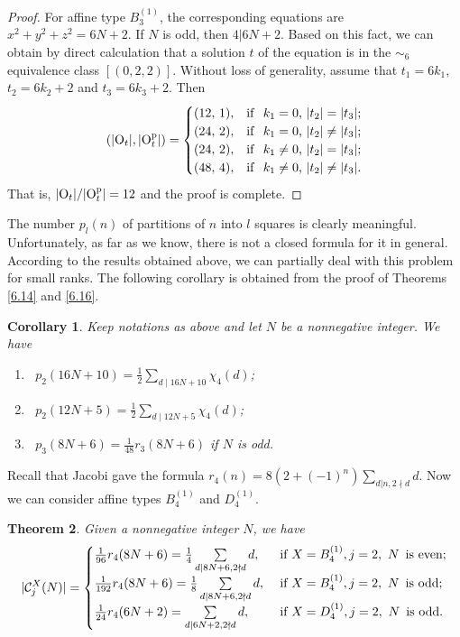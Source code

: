\documentclass[11pt]{amsart}
\theoremstyle{plain}
\numberwithin{equation}{subsection}
\newtheorem{theorem}{Theorem}[section]
\newtheorem{corollary}[theorem]{Corollary}
\begin{document}
\begin{proof}
For affine type $B_3^{(1)}$, the corresponding equations are $x^2+y^2+z^2=6N+2$. 
If $N$ is odd, then $4|6N+2$. Based on this fact, we can obtain by direct calculation 
that a solution $t$ of the equation is in the $\sim_6$ equivalence class $[(0, 2, 2)]$.
Without loss of generality, assume that $t_1=6k_1$, $t_2=6k_2+2$ and $t_3=6k_3+2$. Then
$$(|{\rm O}_t|, |{\rm O}_t^{\rm p}|)=
\begin{cases}
(12,\,1),  &  {\rm if }\,\, \text{ $k_1=0$, $|t_2|=|t_3|$}; \\
(24,\,2),  & {\rm if }\,\, \text{ $k_1=0$, $|t_2|\neq|t_3|$};\\
(24,\,2),  & {\rm if }\,\, \text{ $k_1\neq0$, $|t_2|=|t_3|$};\\
(48,\,4),  & {\rm if }\,\, \text{ $k_1\neq0$, $|t_2|\neq|t_3|$.}
\end{cases}$$
That is, $|{\rm O}_t|/|{\rm O}_t^{\rm p}|=12$ and the proof is complete.
\end{proof}

The number $p_l(n)$ of partitions of $n$ into $l$ squares is clearly meaningful. Unfortunately, as far as we know, there is not a closed formula for it in general.
According to the results obtained above, we can partially deal with this problem for small ranks. 
The following corollary is obtained from the proof of Theorems \ref{6.14} and \ref{6.16}.

\begin{corollary}
Keep notations as above and let $N$ be a nonnegative integer. We have
\begin{enumerate}
  \item[\rm (1)]\, $p_2(16N+10)=\frac{1}{2}\sum\limits_{d\mid 16N+10}\chi_4(d)$;
  \item[\rm (2)]\, $p_2(12N+5)= \frac{1}{2}\sum\limits_{d\mid 12N+5}\chi_4(d)$;
  \item[\rm (3)]\, $p_3(8N+6)= \frac{1}{48}r_3(8N+6)$ if $N$ is odd.
\end{enumerate}
\end{corollary}

Recall that Jacobi gave the formula $r_4(n)=8(2+(-1)^n)\sum\limits_{d|n, 2\nmid d}d$.
Now we can consider affine types $B_4^{(1)}$ and $D_4^{(1)}$. 

\begin{theorem}
Given a nonnegative integer $N$, we have
$$|\mathcal{C}_j^X(N)|=
\begin{cases}
  \frac{1}{96}r_4(8N+6)=\frac{1}{4}\sum\limits_{d\mid 8N+6, 2\nmid d}d,\, & \mbox{\rm if } X=B_4^{(1)}, j=2, \ N \,\ \text{\rm is even}; \\
  \frac{1}{192}r_4(8N+6)=\frac{1}{8}\sum\limits_{d\mid 8N+6, 2\nmid d}d,\,\, & \mbox{\rm if } X=B_4^{(1)}, j=2, \  N \,\ \text{\rm is odd}; \\
  \frac{1}{24}r_4(6N+2)=\sum\limits_{d\mid 6N+2, 2\nmid d}d, & \mbox{\rm if } X=D_4^{(1)}, j=2,  \  N \,\ \text{\rm is odd}.
\end{cases}
$$
\end{theorem}
\end{document}
